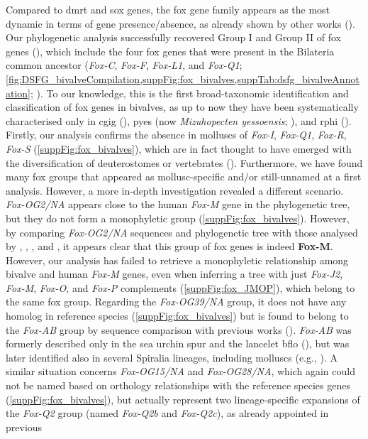 Compared to \gls{dmrt} and \gls{sox} genes, the \gls{fox} gene family appears as the most dynamic in terms of gene presence/absence, as already shown by other works (\textbf{\cite{wu2020identification, seudre2022fox, schomburg2022phylogenetic}}). Our phylogenetic analysis successfully recovered Group I and Group II of \gls{fox} genes (\textbf{\cite{larroux2008genesis}}), which include the four \gls{fox} genes that were present in the Bilateria common ancestor (\textit{Fox-C}, \textit{Fox-F}, \textit{Fox-L1}, and \textit{Fox-Q1}; \cref{fig:DSFG_bivalveCompilation,suppFig:fox_bivalves,suppTab:dsfg_bivalveAnnotation}; \cite{shimeld2010clustered}). To our knowledge, this is the first broad-taxonomic identification and classification of \gls{fox} genes in bivalves, as up to now they have been systematically characterised only in \gls{cgig} (\textbf{\cite{yang2014phylogeny}}), \gls{pyes} (now \textit{Mizuhopecten yessoensis}; \textbf{\cite{wu2020identification}}), and \gls{rphi} (\textbf{\cite{liu2024characterization}}). Firstly, our analysis confirms the absence in molluscs of \textit{Fox-I}, \textit{Fox-Q1}, \textit{Fox-R}, \textit{Fox-S} (\cref{suppFig:fox_bivalves}), which are in fact thought to have emerged with the diversification of deuterostomes or vertebrates (\textbf{\cite{yang2014phylogeny, wu2020identification, seudre2022fox, schomburg2022phylogenetic}}). Furthermore, we have found many \gls{fox} groups that appeared as mollusc-specific and/or still-unnamed at a first analysis. However, a more in-depth investigation revealed a different scenario. \textit{Fox-OG2/NA} appears close to the human \textit{Fox-M} gene in the phylogenetic tree, but they do not form a monophyletic group (\cref{suppFig:fox_bivalves}). However, by comparing \textit{Fox-OG2/NA} sequences and phylogenetic tree with those analysed by \textbf{\cite{yang2014phylogeny}}, \textbf{\cite{wu2020identification}}, \textbf{\cite{schomburg2022phylogenetic}}, and \textbf{\cite{seudre2022fox}}, it appears clear that this group of \gls{fox} genes is indeed \textbf{Fox-M}. However, our analysis has failed to retrieve a monophyletic relationship among bivalve and human \textit{Fox-M} genes, even when inferring a tree with just \textit{Fox-J2}, \textit{Fox-M}, \textit{Fox-O}, and \textit{Fox-P} complements (\cref{suppFig:fox_JMOP}), which belong to the same \gls{fox} group. Regarding the \textit{Fox-OG39/NA} group, it does not have any homolog in reference species (\cref{suppFig:fox_bivalves}) but is found to belong to the \textit{Fox-AB} group by sequence comparison with previous works (\textbf{\cite{yang2014phylogeny, wu2020identification, seudre2022fox}}). \textit{Fox-AB} was formerly described only in the sea urchin \gls{spur} and the lancelet \gls{bflo} (\textbf{\cite{tu2006sea,yu2008fox}}), but was later identified also in several Spiralia lineages, including molluscs (e.g., \textbf{\cite{yang2014phylogeny, wu2020identification, seudre2022fox}}). A similar situation concerns \textit{Fox-OG15/NA} and \textit{Fox-OG28/NA}, which again could not be named based on orthology relationships with the reference species genes (\cref{suppFig:fox_bivalves}), but actually represent two lineage-specific expansions of the \textit{Fox-Q2} group (named \textit{Fox-Q2b} and \textit{Fox-Q2c}), as already appointed in previous 